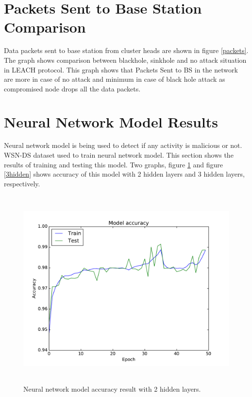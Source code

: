\section{Packets Sent to Base Station Comparison}
Data packets sent to base station from cluster heads are shown in figure \ref{packets}. The graph shows comparison between blackhole, sinkhole and no attack situation in LEACH protocol. This graph shows that Packets Sent to BS in the network are more in case of no attack and minimum in case of black hole attack as compromised node drops all the data packets.

\section{Neural Network Model Results}
\label{NNresults}
Neural network model is being used to detect if any activity is malicious or not. WSN-DS dataset used to train neural network model. This section shows the results of training and testing this model. Two graphs, figure \ref{2hidden} and figure \ref{3hidden} shows accuracy of this model with 2 hidden layers and 3 hidden layers, respectively.
\begin{figure}[hbp]
    \centering
    \includegraphics[width=5.5in, height=4in] {Figures/PDF/2hidden.pdf}
    \caption{Neural network model accuracy result with 2 hidden layers.}
    \label{2hidden}
\end{figure}

